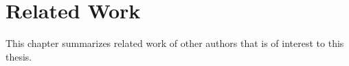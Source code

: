 \chapter{Related Work}
\label{related}

This chapter summarizes related work of other authors that is of interest to this thesis.




